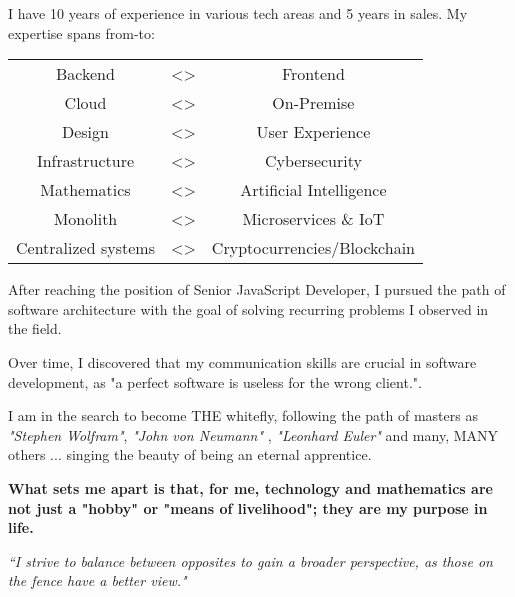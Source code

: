 

\begin{cvparagraph}

\vspace{2mm}

I have 10 years of experience in various tech areas and 5 years in sales. My expertise spans from-to:\par
\begin{center}
\begin{tabular}{c c c}
		Backend & \textless{}\textgreater{} & Frontend    \\
		Cloud   & \textless{}\textgreater{} & On-Premise  \\
		Design  & \textless{}\textgreater{} & User Experience \\
		Infrastructure &  \textless{}\textgreater{} & Cybersecurity \\
		Mathematics &  \textless{}\textgreater{} & Artificial Intelligence \\  
		Monolith &  \textless{}\textgreater{} & Microservices \& IoT \\    
		Centralized systems &  \textless{}\textgreater{} & Cryptocurrencies/Blockchain \\    
\end{tabular}
\end{center}
After reaching the position of Senior JavaScript Developer, I pursued the path of software architecture with the goal of solving recurring problems I observed in the field. \par
Over time, I discovered that my communication skills are crucial in software development, as "a perfect software is useless for the wrong client.".\par
I am in the search to become THE whitefly, following the path of masters as \textit{"Stephen Wolfram"}, \textit{"John von Neumann"} , \textit{"Leonhard Euler"} and many, MANY others ... singing the beauty of being an eternal apprentice.\par
\textbf{What sets me apart is that, for me, technology and mathematics are not just a "hobby" or "means of livelihood"; they are my purpose in life.}\par
\begin{flushright}
\textit{``I strive to balance between opposites to gain a broader perspective, as those on the fence have a better view."}
\end{flushright}

    
\end{cvparagraph}
